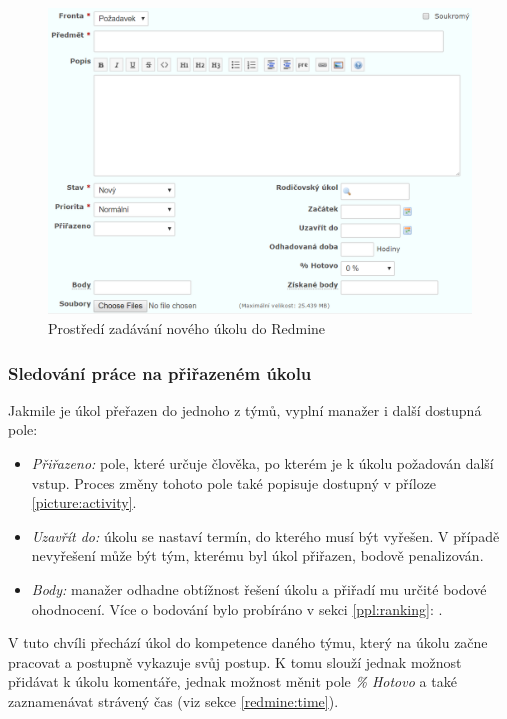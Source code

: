 \begin{figure}[H]
\includegraphics[width=\textwidth]{../png/redmine.png}
\caption{Prostředí zadávání nového úkolu do Redmine} \label{picture:redmine}
\end{figure}

\subsubsection{Sledování práce na přiřazeném úkolu}

Jakmile je úkol přeřazen do jednoho z týmů, vyplní manažer i další dostupná pole:
\begin{itemize}
	\item \emph{Přiřazeno:} pole, které určuje člověka, po kterém je k úkolu požadován další vstup. Proces změny tohoto pole také popisuje  dostupný v příloze \ref{picture:activity}.
	\item \emph{Uzavřít do:} úkolu se nastaví termín, do kterého musí být vyřešen. V případě nevyřešení může být tým, kterému byl úkol přiřazen, bodově penalizován.
	\item \emph{Body:} manažer odhadne obtížnost řešení úkolu a přiřadí mu určité bodové ohodnocení. Více o bodování bylo probíráno v sekci \ref{ppl:ranking}: .
\end{itemize}

V tuto chvíli přechází úkol do kompetence daného týmu, který na úkolu začne pracovat a postupně vykazuje svůj postup. K tomu slouží jednak možnost přidávat k úkolu komentáře, jednak možnost měnit pole \emph{\% Hotovo} a také zaznamenávat strávený čas (viz sekce \ref{redmine:time}).

